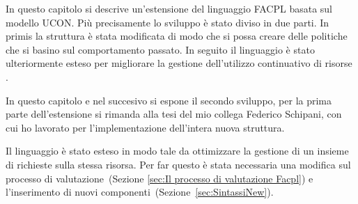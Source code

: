 \label{chap:Usage Control in FACPL}
In questo capitolo si descrive un'estensione del linguaggio \ac{FACPL} basata sul modello \ac{UCON}.
Più precisamente lo sviluppo è stato diviso in due parti. In primis la struttura è stata modificata di modo
che si possa creare delle politiche che si basino sul comportamento passato. In seguito il linguaggio
è stato ulteriormente esteso per migliorare la gestione dell'utilizzo continuativo di risorse .\par
In questo capitolo e nel succesivo si espone il secondo sviluppo, per la prima parte dell'estensione si rimanda
alla tesi del mio collega Federico Schipani, con cui ho lavorato per l'implementazione dell'intera nuova struttura. \par
Il linguaggio è stato esteso in modo tale da ottimizzare la gestione di un insieme di richieste sulla stessa risorsa.
Per far questo è stata necessaria una modifica sul processo di valutazione~(Sezione \ref{sec:Il processo di valutazione Facpl})
e l'inserimento di nuovi componenti~(Sezione~\ref{sec:SintassiNew}).
